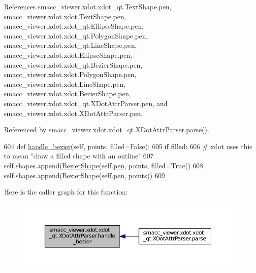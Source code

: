 References smacc\+\_\+viewer.\+xdot.\+xdot\+\_\+qt.\+Text\+Shape.\+pen, smacc\+\_\+viewer.\+xdot.\+xdot.\+Text\+Shape.\+pen, smacc\+\_\+viewer.\+xdot.\+xdot\+\_\+qt.\+Ellipse\+Shape.\+pen, smacc\+\_\+viewer.\+xdot.\+xdot\+\_\+qt.\+Polygon\+Shape.\+pen, smacc\+\_\+viewer.\+xdot.\+xdot\+\_\+qt.\+Line\+Shape.\+pen, smacc\+\_\+viewer.\+xdot.\+xdot.\+Ellipse\+Shape.\+pen, smacc\+\_\+viewer.\+xdot.\+xdot\+\_\+qt.\+Bezier\+Shape.\+pen, smacc\+\_\+viewer.\+xdot.\+xdot.\+Polygon\+Shape.\+pen, smacc\+\_\+viewer.\+xdot.\+xdot.\+Line\+Shape.\+pen, smacc\+\_\+viewer.\+xdot.\+xdot.\+Bezier\+Shape.\+pen, smacc\+\_\+viewer.\+xdot.\+xdot\+\_\+qt.\+X\+Dot\+Attr\+Parser.\+pen, and smacc\+\_\+viewer.\+xdot.\+xdot.\+X\+Dot\+Attr\+Parser.\+pen.



Referenced by smacc\+\_\+viewer.\+xdot.\+xdot\+\_\+qt.\+X\+Dot\+Attr\+Parser.\+parse().


\begin{DoxyCode}
604     \textcolor{keyword}{def }\hyperlink{classsmacc__viewer_1_1xdot_1_1xdot__qt_1_1XDotAttrParser_a12c533d685f8e0d1f7edf966bff14e75}{handle\_bezier}(self, points, filled=False):
605         \textcolor{keywordflow}{if} filled:
606             \textcolor{comment}{# xdot uses this to mean "draw a filled shape with an outline"}
607             self.shapes.append(\hyperlink{classsmacc__viewer_1_1xdot_1_1xdot__qt_1_1BezierShape}{BezierShape}(self.\hyperlink{classsmacc__viewer_1_1xdot_1_1xdot__qt_1_1XDotAttrParser_a22ec4e08bbdb0ba31a8b5e09db560d8c}{pen}, points, filled=\textcolor{keyword}{True}))
608         self.shapes.append(\hyperlink{classsmacc__viewer_1_1xdot_1_1xdot__qt_1_1BezierShape}{BezierShape}(self.\hyperlink{classsmacc__viewer_1_1xdot_1_1xdot__qt_1_1XDotAttrParser_a22ec4e08bbdb0ba31a8b5e09db560d8c}{pen}, points))
609 
\end{DoxyCode}


Here is the caller graph for this function\+:
\nopagebreak
\begin{figure}[H]
\begin{center}
\leavevmode
\includegraphics[width=350pt]{classsmacc__viewer_1_1xdot_1_1xdot__qt_1_1XDotAttrParser_a12c533d685f8e0d1f7edf966bff14e75_icgraph}
\end{center}
\end{figure}


